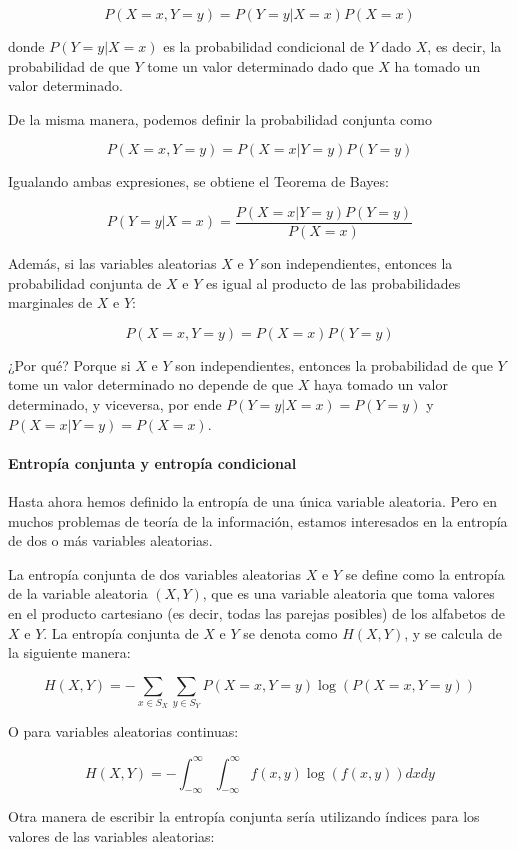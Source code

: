 \[
P(X=x,Y=y) = P(Y=y|X=x)P(X=x)
\]

donde \(P(Y=y|X=x)\) es la probabilidad condicional de \(Y\) dado \(X\),
es decir, la probabilidad de que \(Y\) tome un valor determinado dado
que \(X\) ha tomado un valor determinado.

De la misma manera, podemos definir la probabilidad conjunta como

\[
P(X=x,Y=y) = P(X=x|Y=y)P(Y=y)
\]

Igualando ambas expresiones, se obtiene el Teorema de Bayes:

\[
P(Y=y|X=x) = \frac{P(X=x|Y=y)P(Y=y)}{P(X=x)}
\]

Además, si las variables aleatorias \(X\) e \(Y\) son independientes,
entonces la probabilidad conjunta de \(X\) e \(Y\) es igual al producto
de las probabilidades marginales de \(X\) e \(Y\):

\[
P(X=x,Y=y) = P(X=x)P(Y=y)
\]

¿Por qué? Porque si \(X\) e \(Y\) son independientes, entonces la
probabilidad de que \(Y\) tome un valor determinado no depende de que
\(X\) haya tomado un valor determinado, y viceversa, por ende
\(P(Y=y|X=x) = P(Y=y)\) y \(P(X=x|Y=y) = P(X=x)\).

\paragraph{Entropía conjunta y entropía
condicional}\label{entropuxeda-conjunta-y-entropuxeda-condicional}

Hasta ahora hemos definido la entropía de una única variable aleatoria.
Pero en muchos problemas de teoría de la información, estamos
interesados en la entropía de dos o más variables aleatorias.

La entropía conjunta de dos variables aleatorias \(X\) e \(Y\) se define
como la entropía de la variable aleatoria \((X,Y)\), que es una variable
aleatoria que toma valores en el producto cartesiano (es decir, todas
las parejas posibles) de los alfabetos de \(X\) e \(Y\). La entropía
conjunta de \(X\) e \(Y\) se denota como \(H(X,Y)\), y se calcula de la
siguiente manera:

\[
H(X,Y) = -\sum_{x\in S_X}\sum_{y\in S_Y} P(X=x,Y=y)\log\left(P(X=x,Y=y)\right)
\]

O para variables aleatorias continuas:

\[
H(X,Y) = -\int_{-\infty}^{\infty}\int_{-\infty}^{\infty} f(x,y)\log\left(f(x,y)\right)dxdy
\]

Otra manera de escribir la entropía conjunta sería utilizando índices
para los valores de las variables aleatorias:

